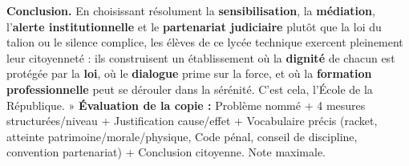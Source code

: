 \documentclass[11pt]{article}
\begin{document}
\begin{exoresolu}
\textbf{Conclusion.} En choisissant résolument la \textbf{sensibilisation}, la \textbf{médiation}, l'\textbf{alerte institutionnelle} et le \textbf{partenariat judiciaire} plutôt que la loi du talion ou le silence complice, les élèves de ce lycée technique exercent pleinement leur citoyenneté : ils construisent un établissement où la \textbf{dignité} de chacun est protégée par la \textbf{loi}, où le \textbf{dialogue} prime sur la force, et où la \textbf{formation professionnelle} peut se dérouler dans la sérénité. C'est cela, l'École de la République. »
\textbf{Évaluation de la copie :} Problème nommé + 4 mesures structurées/niveau + Justification cause/effet + Vocabulaire précis (racket, atteinte patrimoine/morale/physique, Code pénal, conseil de discipline, convention partenariat) + Conclusion citoyenne. Note maximale.
\end{exoresolu}
\end{document}
